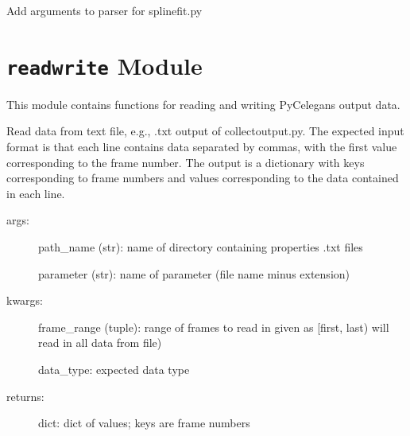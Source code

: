 \documentclass[letterpaper,10pt,openany,oneside]{sphinxmanual}
\begin{document}

\begin{fulllineitems}
\label{index:parseargs.addsplinefit}
Add arguments to parser for splinefit.py

\end{fulllineitems}


\begin{fulllineitems}
\label{index:parseargs.main}
\end{fulllineitems}



\chapter{\texttt{readwrite} Module}
\label{index:module-readwrite}\label{index:readwrite-module}
This module contains functions for reading and writing PyCelegans output data.

\begin{fulllineitems}
\label{index:readwrite.readtxt}
Read data from text file, e.g., .txt output of collectoutput.py.
The expected input format is that each line contains data separated by 
commas, with the first value corresponding to the frame number.
The output is a dictionary with keys corresponding to frame numbers
and values corresponding to the data contained in each line.
\begin{description}
\item[{args:}] \leavevmode
path\_name (str): name of directory containing properties .txt files

parameter (str): name of parameter (file name minus extension)

\item[{kwargs:}] \leavevmode
frame\_range (tuple): range of frames to read in given as {[}first, last)
will read in all data from file)

data\_type: expected data type

\item[{returns:}] \leavevmode
dict: dict of values; keys are frame numbers

\end{description}

\end{fulllineitems}
\end{document}
